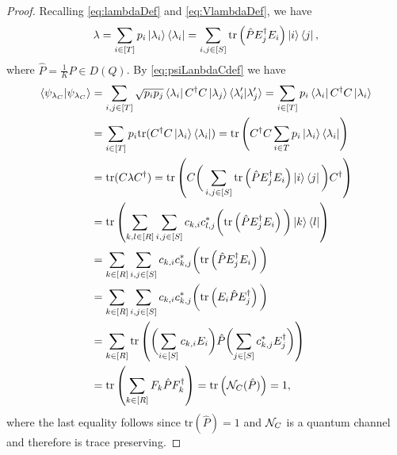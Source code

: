 \documentclass[10pt]{article}
\newcommand{\tr}{\mathrm{tr}}
\newcommand{\p}[1]{\left(#1\right)}
\begin{document}
\begin{proof}
    Recalling \eqref{eq:lambdaDef} and \eqref{eq:VlambdaDef}, we have
    \[\lambda=\sum_{i\in[T]}p_i\ket{\lambda_i}\bra{\lambda_i}=\sum_{i,j\in [S]}\tr\p{\hat{P}E_j^\dag E_i} \ket{i}\bra{j},\]
    where $\hat{P}=\frac{1}{K}P\in D(Q)$. By \eqref{eq:psiLanbdaCdef} we have 
    \begin{align*}
        \braket{\psi_{\lambda_C} | \psi_{\lambda_C}} &=\sum_{i,j\in [T]}\sqrt{p_ip_j}\bra{\lambda_i}C^\dag C \ket{ \lambda_j }   \braket{\lambda_i'| \lambda_j'}=\sum_{i\in [T]}p_i\bra{\lambda_i}C^\dag C \ket{ \lambda_i } \\
        &=\sum_{i\in[T]}p_i\tr(C^\dag C \ket{\lambda_i}\bra{\lambda_i})=\tr\p{C^\dag C\sum_{i\in {T}}p_i\ket{\lambda_i}\bra{\lambda_i}}\\
        &=\tr(C\lambda C^\dag)=\tr\p{C \bigg(\sum_{i,j\in [S]}\tr\p{\hat{P} {E_j^\dag E_i}}\ket{i}\bra{j}\bigg) C^\dag}\\
        &=\tr\p{\sum_{k,l\in [R]}\sum_{i,j\in [S]}  {c_{k,i}c_{l,j}^*} \bigg(\tr\p{\hat{P} {E_j^\dag E_i}}\bigg)\ket{k}\bra{l} }\\
        &=\sum_{k\in [R]}\sum_{i,j\in [S]}  {c_{k,i}c_{k,j}^*} \bigg(\tr\p{\hat{P} {E_j^\dag E_i}}\bigg)\\
        &=\sum_{k\in [R]}\sum_{i,j\in [S]}  {c_{k,i}c_{k,j}^*} \bigg(\tr\p{ {E_i}\hat{P} {E_j^\dag} }\bigg)\\
        &=\sum_{k\in [R]} \tr\p{\bigg( {\sum_{i\in [S]}c_{k,i}E_i}\bigg)\hat{P}\bigg( {\sum_{j\in [S]}c_{k,j}^*E_j^\dag}\bigg)}\\&=\tr\p{\sum_{k\in [R]}F_k \hat{P}F_k^\dag}=\tr\p{\calN_C(\hat{P})}=1,
    \end{align*}
    where the last equality follows since $\tr(\hat{P})=1$ and ${\cal N}_C$ is a quantum channel and therefore is trace preserving.
    
    \end{proof}
\end{document}
